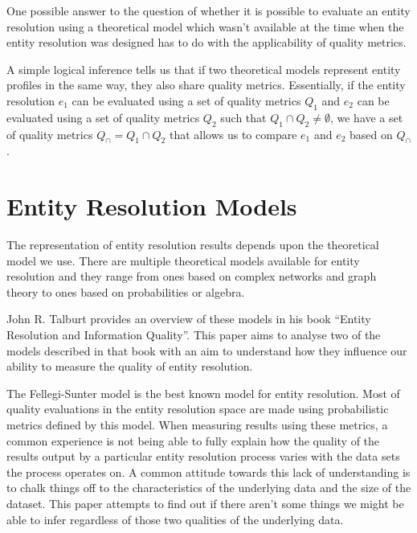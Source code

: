 \documentclass[journal]{IEEEtran}
\begin{document}
    One possible answer to the question of whether it is possible to evaluate
    an entity resolution using a theoretical model which wasn't available at the
    time when the entity resolution was designed has to do with the
    applicability of quality metrics.

    A simple logical inference tells us that if two theoretical models represent
    entity profiles in the same way, they also share quality metrics.
    Essentially, if the entity resolution $e_1$ can be evaluated using a set of
    quality metrics $Q_1$ and $e_2$ can be evaluated using a set of quality
    metrics $Q_2$ such that $Q_1 \cap Q_2 \neq \emptyset$, we have a set of
    quality metrics $Q_\cap = Q_1 \cap Q_2$ that allows us to compare $e_1$ and
    $e_2$ based on $Q_\cap$.
    
    \section[models]{Entity Resolution Models}\label{sec:models}

    The representation of entity resolution results depends upon the theoretical
    model we use.
    There are multiple theoretical models available for entity resolution and
    they range from ones based on complex networks and graph theory\cite{Li2020}
    to ones based on probabilities\cite{fs1969} or
    algebra\cite{Tal11,Ben2009Swoosh}.

    John R. Talburt provides an overview of these models in his book ``Entity
    Resolution and Information Quality''\cite{Tal11}.
    This paper aims to analyse two of the models described in that book with an
    aim to understand how they influence our ability to measure the quality of
    entity resolution.

    The Fellegi-Sunter model is the best known model for entity resolution.
    Most of quality evaluations in the entity resolution space are made using
    probabilistic metrics defined by this model.
    When measuring results using these metrics, a common experience is not being
    able to fully explain how the quality of the results output by a particular
    entity resolution process varies with the data sets the process operates on.
    A common attitude towards this lack of understanding is to chalk things off
    to the characteristics of the underlying data and the size of the dataset.
    This paper attempts to find out if there aren't some things we might be able
    to infer regardless of those two qualities of the underlying data.
\end{document}
